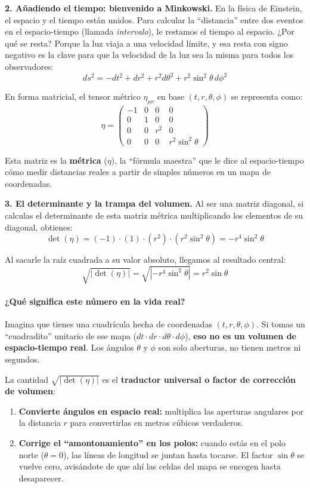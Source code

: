 \documentclass[11pt,a4paper]{article}
\begin{document}
\noindent\textbf{2. Añadiendo el tiempo: bienvenido a Minkowski.} En la física de Einstein, el espacio y el tiempo están unidos. Para calcular la ``distancia'' entre dos eventos en el espacio-tiempo (llamada \textit{intervalo}), le restamos el tiempo al espacio. ¿Por qué se resta? Porque la luz viaja a una velocidad límite, y esa resta con signo negativo es la clave para que la velocidad de la luz sea la misma para todos los observadores:
\[
ds^2 = -dt^2 + dr^2 + r^2 d\theta^2 + r^2 \sin^2\theta \, d\phi^2
\]

En forma matricial, el tensor métrico $\eta_{\mu\nu}$ en base $(t, r, \theta, \phi)$ se representa como:
\[
\eta = \begin{pmatrix} 
-1 & 0 & 0 & 0 \\ 
0 & 1 & 0 & 0 \\ 
0 & 0 & r^2 & 0 \\ 
0 & 0 & 0 & r^2 \sin^2\theta 
\end{pmatrix}
\]

Esta matriz es la \textbf{métrica} ($\eta$), la ``fórmula maestra'' que le dice al espacio-tiempo cómo medir distancias reales a partir de simples números en un mapa de coordenadas.

\noindent\textbf{3. El determinante y la trampa del volumen.} Al ser una matriz diagonal, si calculas el determinante de esta matriz métrica multiplicando los elementos de su diagonal, obtienes:
\[
\det(\eta) = (-1) \cdot (1) \cdot (r^2) \cdot (r^2 \sin^2\theta) = -r^4 \sin^2\theta
\]

Al sacarle la raíz cuadrada a su valor absoluto, llegamos al resultado central:
\[
\sqrt{|\det(\eta)|} = \sqrt{|-r^4 \sin^2\theta|} = r^2 \sin\theta
\]

\paragraph{¿Qué significa este número en la vida real?}

Imagina que tienes una cuadrícula hecha de coordenadas $(t, r, \theta, \phi)$. Si tomas un ``cuadradito'' unitario de ese mapa ($dt \cdot dr \cdot d\theta \cdot d\phi$), \textbf{eso no es un volumen de espacio-tiempo real}. Los ángulos $\theta$ y $\phi$ son solo aberturas, no tienen metros ni segundos.

La cantidad $\sqrt{|\det(\eta)|}$ es el \textbf{traductor universal o factor de corrección de volumen}:

\begin{enumerate}
    \item \textbf{Convierte ángulos en espacio real:} multiplica las aperturas angulares por la distancia $r$ para convertirlas en metros cúbicos verdaderos.
    \item \textbf{Corrige el ``amontonamiento'' en los polos:} cuando estás en el polo norte ($\theta = 0$), las líneas de longitud se juntan hasta tocarse. El factor $\sin\theta$ se vuelve cero, avisándote de que ahí las celdas del mapa se encogen hasta desaparecer.
\end{enumerate}
\end{document}
